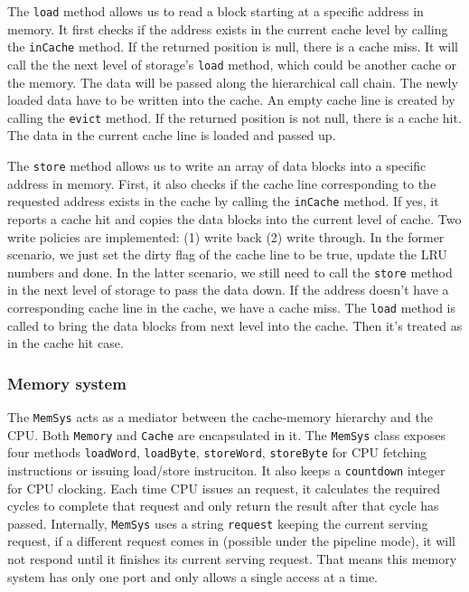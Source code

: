 \documentclass{sig-alternate}
\begin{document}
The \texttt{load} method allows us to read a block starting at a specific address in memory. It first checks if the address exists in the current cache level by calling the \texttt{inCache} method. If the returned position is null, there is a cache miss. It will call the the next level of storage's \texttt{load} method, which could be another cache or the memory. The data will be passed along the hierarchical call chain. The newly loaded data have to be written into the cache. An empty cache line is created by calling the \texttt{evict} method. If the returned position is not null, there is a cache hit. The data in the current cache line is loaded and passed up. 

The \texttt{store} method allows us to write an array of data blocks into a specific address in memory. First, it also checks if the cache line corresponding to the requested address exists in the cache by calling the \texttt{inCache} method. If yes, it reports a cache hit and copies the data blocks into the current level of cache. Two write policies are implemented: (1) write back (2) write through. In the former scenario, we just set the dirty flag of the cache line to be true, update the LRU numbers and done. In the latter scenario, we still need to call the \texttt{store} method in the next level of storage to pass the data down. If the address doesn't have a corresponding cache line in the cache, we have a cache miss. The \texttt{load} method is called to bring the data blocks from next level into the cache. Then it's treated as in the cache hit case. 
 
\subsubsection{Memory system}
The \texttt{MemSys} acts as a mediator between the cache-memory hierarchy and the CPU. Both \texttt{Memory} and \texttt{Cache} are encapsulated in it. The \texttt{MemSys} class exposes four methods \texttt{loadWord}, \texttt{loadByte}, \texttt{storeWord}, \texttt{storeByte} for CPU fetching instructions or issuing load/store instruciton. It also keeps a \texttt{countdown} integer for CPU clocking. Each time CPU issues an request, it calculates the required cycles to complete that request and only return the result after that cycle has passed. Internally, \texttt{MemSys} uses a string \texttt{request} keeping the current serving request, if a different request comes in (possible under the pipeline mode), it will not respond until it finishes its current serving request. That means this memory system has only one port and only allows a single access at a time. 
\end{document}
